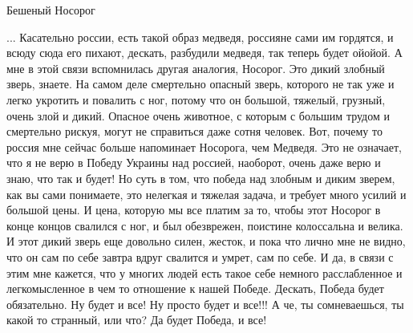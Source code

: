  
 
 
 
 

Бешеный Носорог

... Касательно россии, есть такой образ медведя, россияне сами им гордятся, и
всюду сюда его пихают, дескать, разбудили медведя, так теперь будет ойойой.  А
мне в этой связи вспомнилась другая аналогия, Носорог. Это дикий злобный зверь,
знаете.  На самом деле смертельно опасный зверь, которого не так уже и легко
укротить и повалить с ног, потому что он большой, тяжелый, грузный, очень злой
и дикий. Опасное очень животное, с которым с большим трудом и смертельно
рискуя, могут не справиться даже сотня человек.  Вот, почему то россия мне
сейчас больше напоминает Носорога, чем Медведя. Это не означает, что я не верю
в Победу Украины над россией, наоборот, очень даже верю и знаю, что так и
будет!  Но суть в том, что победа над злобным и диким зверем, как вы сами
понимаете, это нелегкая и тяжелая задача, и требует много усилий и большой
цены. И цена, которую мы все платим за то, чтобы этот Носорог в конце концов
свалился с ног, и был обезврежен, поистине колоссальна и велика. И этот дикий
зверь еще довольно силен, жесток, и пока что лично мне не видно, что он сам по
себе завтра вдруг свалится и умрет, сам по себе.  И да, в связи с этим мне
кажется, что у многих людей есть такое себе немного расслабленное и
легкомысленное в чем то отношение к нашей Победе.  Дескать, Победа будет
обязательно. Ну будет и все! Ну просто будет и все!!! А че, ты сомневаешься, ты
какой то странный, или что? Да будет Победа, и все!

